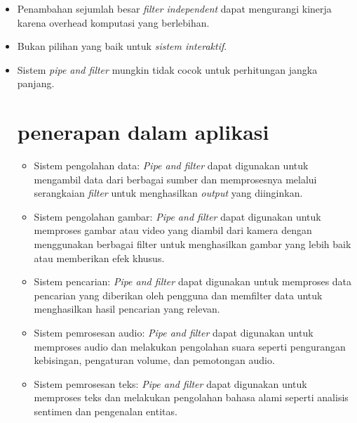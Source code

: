 	\begin{itemize}
		\item Penambahan sejumlah besar \textit{filter independent} dapat mengurangi kinerja karena overhead komputasi yang berlebihan.
		\item Bukan pilihan yang baik untuk \textit{sistem interaktif}.
		\item Sistem \textit{pipe and filter} mungkin tidak cocok untuk perhitungan jangka panjang.
		
	\section{penerapan dalam aplikasi}
		\begin{itemize}
			\item Sistem pengolahan data: \textit{Pipe and filter} dapat digunakan untuk mengambil data dari berbagai sumber dan memprosesnya melalui serangkaian \textit{filter} untuk menghasilkan \textit{output} yang diinginkan.
			
			\item Sistem pengolahan gambar: \textit{Pipe and filter} dapat digunakan untuk memproses gambar atau video yang diambil dari kamera dengan menggunakan berbagai filter untuk menghasilkan gambar yang lebih baik atau memberikan efek khusus.
			
			\item Sistem pencarian: \textit{Pipe and filter} dapat digunakan untuk memproses data pencarian yang diberikan oleh pengguna dan memfilter data untuk menghasilkan hasil pencarian yang relevan.
			
			\item Sistem pemrosesan audio: \textit{Pipe and filter} dapat digunakan untuk memproses audio dan melakukan pengolahan suara seperti pengurangan kebisingan, pengaturan volume, dan pemotongan audio.
			
			\item Sistem pemrosesan teks: \textit{Pipe and filter} dapat digunakan untuk memproses teks dan melakukan pengolahan bahasa alami seperti analisis sentimen dan pengenalan entitas.
		\end{itemize}
	\end{itemize}

